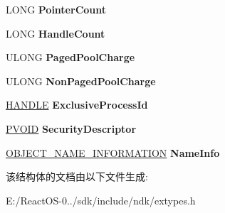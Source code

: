 \begin{DoxyCompactItemize}
L\+O\+NG {\bfseries Pointer\+Count}
\item 
\mbox{\label{struct___s_y_s_t_e_m___o_b_j_e_c_t___i_n_f_o_r_m_a_t_i_o_n_ad2102d95ce92792c38a8d0daa04ee8f4}} 
L\+O\+NG {\bfseries Handle\+Count}
\item 
\mbox{\label{struct___s_y_s_t_e_m___o_b_j_e_c_t___i_n_f_o_r_m_a_t_i_o_n_a3af83d63e8cef9a5db9b4ce262ff2276}} 
U\+L\+O\+NG {\bfseries Paged\+Pool\+Charge}
\item 
\mbox{\label{struct___s_y_s_t_e_m___o_b_j_e_c_t___i_n_f_o_r_m_a_t_i_o_n_a6e20922bb6be89455b9fc48e7da213af}} 
U\+L\+O\+NG {\bfseries Non\+Paged\+Pool\+Charge}
\item 
\mbox{\label{struct___s_y_s_t_e_m___o_b_j_e_c_t___i_n_f_o_r_m_a_t_i_o_n_abe9016db01daffd5ab9515e810482a67}} 
\hyperlink{interfacevoid}{H\+A\+N\+D\+LE} {\bfseries Exclusive\+Process\+Id}
\item 
\mbox{\label{struct___s_y_s_t_e_m___o_b_j_e_c_t___i_n_f_o_r_m_a_t_i_o_n_a599430e34c91211d4a46a1bd25c80cdf}} 
\hyperlink{interfacevoid}{P\+V\+O\+ID} {\bfseries Security\+Descriptor}
\item 
\mbox{\label{struct___s_y_s_t_e_m___o_b_j_e_c_t___i_n_f_o_r_m_a_t_i_o_n_a2c0a6471931b087d2c0ec09052a8d10e}} 
\hyperlink{struct___o_b_j_e_c_t___n_a_m_e___i_n_f_o_r_m_a_t_i_o_n}{O\+B\+J\+E\+C\+T\+\_\+\+N\+A\+M\+E\+\_\+\+I\+N\+F\+O\+R\+M\+A\+T\+I\+ON} {\bfseries Name\+Info}
\end{DoxyCompactItemize}


该结构体的文档由以下文件生成\+:\begin{DoxyCompactItemize}
\item 
E\+:/\+React\+O\+S-\/0../sdk/include/ndk/extypes.\+h\end{DoxyCompactItemize}
